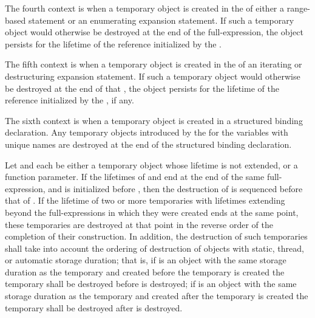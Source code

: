 \pnum
The fourth context is when a temporary object
is created in the  of
either a range-based  statement
or an enumerating expansion statement.
If such a temporary object would otherwise be destroyed
at the end of the  full-expression,
the object persists for the lifetime of the reference
initialized by the .

\pnum
The fifth context is when a temporary object is created
in the 
of an iterating or destructuring expansion statement.
If such a temporary object would otherwise be destroyed
at the end of that ,
the object persists for the lifetime of the reference
initialized by the , if any.

\pnum
The sixth context is when a temporary object
is created in a structured binding declaration.
Any temporary objects introduced by
the  for the variables
with unique names
are destroyed at the end of the structured binding declaration.

\pnum
Let  and  each be either
a temporary object whose lifetime is not extended, or
a function parameter.
If the lifetimes of  and  end at
the end of the same full-expression, and
 is initialized before , then
the destruction of  is sequenced before that of .
If the lifetime of two or more temporaries
with lifetimes extending beyond the full-expressions in which they were created
ends at the same point,
these temporaries are destroyed at that point in the reverse order of the
completion of their construction.
In addition, the destruction of such temporaries shall
take into account the ordering of destruction of objects with static, thread, or
automatic storage duration;
that is, if
is an object with the same storage duration as the temporary and
created before the temporary is created
the temporary shall be destroyed before
is destroyed;
if
is an object with the same storage duration as the temporary and
created after the temporary is created
the temporary shall be destroyed after
is destroyed.

